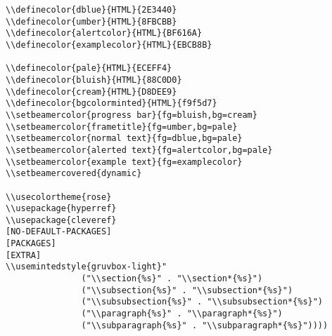 \documentclass[c]{article}
\theoremstyle{plain}%
\theoremstyle{definition}
\theoremstyle{remark}
\begin{document}
\begin{verbatim}
\\definecolor{dblue}{HTML}{2E3440}
\\definecolor{umber}{HTML}{8FBCBB}
\\definecolor{alertcolor}{HTML}{BF616A}
\\definecolor{examplecolor}{HTML}{EBCB8B}

\\definecolor{pale}{HTML}{ECEFF4}
\\definecolor{bluish}{HTML}{88C0D0}
\\definecolor{cream}{HTML}{D8DEE9}
\\definecolor{bgcolorminted}{HTML}{f9f5d7}
\\setbeamercolor{progress bar}{fg=bluish,bg=cream}
\\setbeamercolor{frametitle}{fg=umber,bg=pale}
\\setbeamercolor{normal text}{fg=dblue,bg=pale}
\\setbeamercolor{alerted text}{fg=alertcolor,bg=pale}
\\setbeamercolor{example text}{fg=examplecolor}
\\setbeamercovered{dynamic}

\\usecolortheme{rose}
\\usepackage{hyperref}
\\usepackage{cleveref}
[NO-DEFAULT-PACKAGES]
[PACKAGES]
[EXTRA]
\\usemintedstyle{gruvbox-light}"
               ("\\section{%s}" . "\\section*{%s}")
               ("\\subsection{%s}" . "\\subsection*{%s}")
               ("\\subsubsection{%s}" . "\\subsubsection*{%s}")
               ("\\paragraph{%s}" . "\\paragraph*{%s}")
               ("\\subparagraph{%s}" . "\\subparagraph*{%s}"))))
\end{verbatim}
\end{document}
